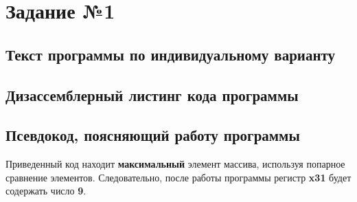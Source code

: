 \chapter{Задание №1}

\section{Текст программы по индивидуальному варианту}



\section{Дизассемблерный листинг кода программы}



\section{Псевдокод, поясняющий работу программы}



Приведенный код находит \textbf{максимальный} элемент массива, используя попарное сравнение элементов. Следовательно, после работы программы регистр \textbf{x31} будет содержать число \textbf{9}.